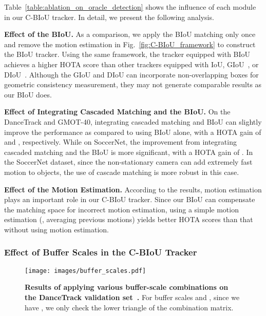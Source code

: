 \documentclass[journal]{IEEEtran}
\begin{document}
Table~\ref{table:ablation_on_oracle_detection} shows the influence of each module in our C-BIoU tracker. In detail, we present the following analysis.

\noindent \textbf{Effect of the BIoU.} As a comparison, we apply the BIoU matching only once and remove the motion estimation in Fig.~\ref{fig:C-BIoU_framework} to construct the BIoU tracker. Using the same framework, the tracker equipped with BIoU achieves a higher HOTA score than other trackers equipped with IoU, GIoU~\cite{giou2019}, or DIoU~\cite{zheng2020distance}. Although the GIoU and DIoU can incorporate non-overlapping boxes for geometric consistency measurement, they may not generate comparable results as our BIoU does.


\noindent \textbf{Effect of Integrating Cascaded Matching and the BIoU.}  On the DanceTrack and GMOT-40, integrating cascaded matching and BIoU can slightly improve the performance as compared to using BIoU alone, with a HOTA gain of  and , respectively. While on SoccerNet, the improvement from integrating cascaded matching and the BIoU is more significant, with a HOTA gain of . In the SoccerNet dataset, since the non-stationary camera can add extremely fast motion to objects, the use of cascade matching is more robust in this case.


\noindent \textbf{Effect of the Motion Estimation.} According to the results, motion estimation plays an important role in our C-BIoU tracker. Since our BIoU can compensate the matching space for incorrect motion estimation, using a simple motion estimation (\ie, averaging previous motions) yields better HOTA scores than that without using motion estimation.


\subsubsection{Effect of Buffer Scales in the C-BIoU Tracker}


\begin{figure}[h!]
   \centering
   \texttt{[image: images/buffer\_scales.pdf]}
   \caption{\textbf{Results of applying various buffer-scale combinations on the DanceTrack validation set~\cite{sun2022dancetrack}.} For buffer scales  and , since we have , we only check the lower triangle of the combination matrix.}
   \label{fig:buffer_scales}
\end{figure}
\end{document}
